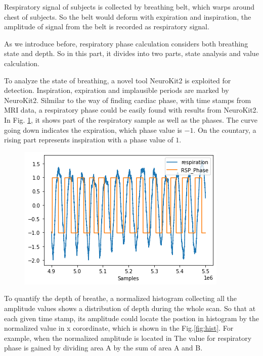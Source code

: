 Respiratory signal of subjects is collected by breathing belt, which warps around chest of subjects. 
So the belt would deform with expiration and inspiration, the amplitude of signal from the 
belt is recorded as respiratory signal. 

As we introduce before, respiratory phase calculation considers both breathing state and depth.
So in this part, it divides into two parts, state analysis and value calculation.

To analyze the state of breathing, a novel tool NeuroKit2\cite{Makowski2021neurokit} is exploited 
for detection. Inspiration, expiration and implausible periods are marked by NeuroKit2. 
Silmilar to the way of finding cardiac phase, with time stamps from MRI data, a respiratory phase
could be easily found with results from NeuroKit2. In Fig. \ref{fig:rsp_phase}, it shows part of the 
respiratory sample as well as the phases. The curve going down indicates the expiration, which 
phase value is $-1$. On the countary, a rising part represents inspiration with a phase value of $1$. 

\begin{figure}[htp]
    \centering
    \includegraphics[width=\columnwidth]{Figures/rsp_phase.png}
    \caption{}
    \label{fig:rsp_phase}
\end{figure} 

To quantify the depth of breathe, a normalized histogram collecting all the amplitude values
shows a distribution of depth during the whole scan. 
So that at each given time stamp, its amplitude could locate the postion in histogram by the normalized value in x corordinate,
which is shown in the Fig.\ref{fig:hist}. For example, when the normalized amplitude is located in 
The value for respiratory phase is gained by dividing area A by the sum of area A and B.

